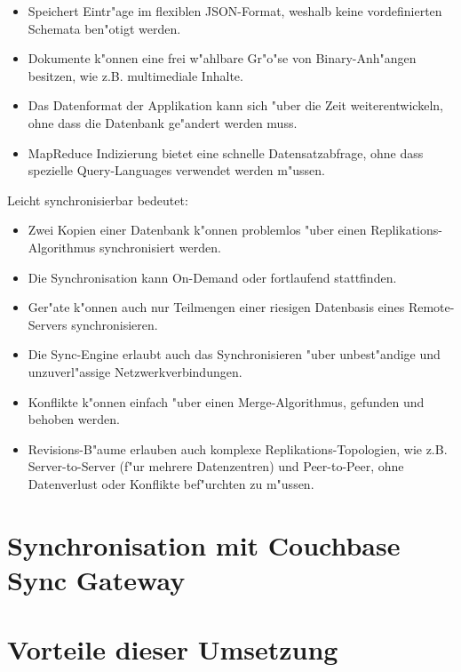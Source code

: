 \documentclass[a4paper,12pt]{scrreprt}
\begin{document}
\begin{itemize}
\item Speichert Eintr"age im flexiblen JSON-Format, weshalb keine vordefinierten Schemata ben"otigt werden.
\item Dokumente k"onnen eine frei w"ahlbare Gr"o"se von Binary-Anh"angen besitzen, wie z.B. multimediale Inhalte.
\item Das Datenformat der Applikation kann sich "uber die Zeit weiterentwickeln, ohne dass die Datenbank ge"andert werden muss.
\item MapReduce Indizierung bietet eine schnelle Datensatzabfrage, ohne dass spezielle Query-Languages verwendet werden m"ussen.
\end{itemize}
Leicht synchronisierbar bedeutet:
\begin{itemize}
\item Zwei Kopien einer Datenbank k"onnen problemlos "uber einen Replikations-Algorithmus synchronisiert werden.
\item Die Synchronisation kann On-Demand oder fortlaufend stattfinden.
\item Ger"ate k"onnen auch nur Teilmengen einer riesigen Datenbasis eines Remote-Servers synchronisieren.
\item Die Sync-Engine erlaubt auch das Synchronisieren "uber unbest"andige und unzuverl"assige Netzwerkverbindungen.
\item Konflikte k"onnen einfach "uber einen Merge-Algorithmus, gefunden und behoben werden.
\item Revisions-B"aume erlauben auch komplexe Replikations-Topologien, wie z.B. Server-to-Server (f"ur mehrere Datenzentren) und Peer-to-Peer, ohne Datenverlust oder Konflikte bef"urchten zu m"ussen.
\end{itemize}
\cite{couch1}
\section{Synchronisation mit Couchbase Sync Gateway}
\cite{sync1}
\section{Vorteile dieser Umsetzung}

\end{document}
